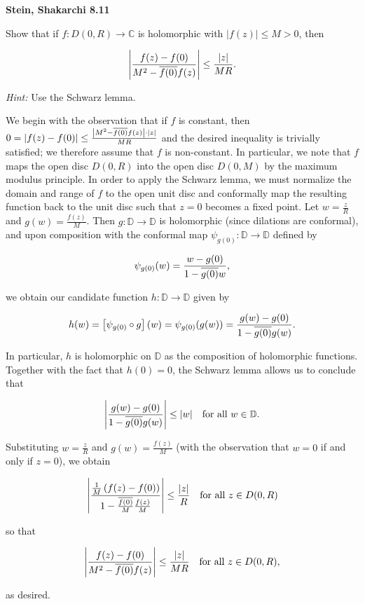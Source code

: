 \textbf{Stein, Shakarchi 8.11}

Show that if $f : D(0, R) \to \mathbb{C}$ is holomorphic with $|f(z)| \leq M > 0$, then

$$
\left| \frac{f(z) - f(0)}{M^2 - \overline{f(0)} f(z)} \right| \le \frac{|z|}{MR}.
$$

\textit{Hint: } Use the Schwarz lemma.

\begin{solution}
  We begin with the observation that if $f$ is constant, then
  $0 = |f(z) - f(0)| \le \frac{\left|M^2 - \overline{f(0)}f(z)\right| \cdot |z|}{MR}$ 
  and the desired inequality is trivially satisfied; we therefore assume that $f$ is non-constant. In particular, we note that $f$ maps the open disc $D(0, R)$ 
  into the open disc $D(0, M)$ by the maximum modulus principle. In order to apply the Schwarz lemma, we must normalize 
  the domain and range of $f$ to the open unit disc and conformally map the resulting function back to the unit disc 
  such that $z = 0$ becomes a fixed point. Let $w = \frac{z}{R}$ and $g(w) = \frac{f(z)}{M}$. Then $g : \mathbb{D} \to \mathbb{D}$ is holomorphic (since 
  dilations are conformal), and upon composition with the conformal map $\psi_{g(0)}: \mathbb{D} \to \mathbb{D}$ defined 
  by

  $$
  \psi_{g(0)}(w) = \frac{w - g(0)}{1 - \overline{g(0)}w},
  $$

  we obtain our candidate function $h: \mathbb{D} \to \mathbb{D}$ given by

  $$
  h(w) = \left[\psi_{g(0)} \circ g\right] (w) = \psi_{g(0)}(g(w)) = \frac{g(w) - g(0)}{1 - \overline{g(0)}g(w)}.
  $$

  In particular, $h$ is holomorphic on $\mathbb{D}$ as the composition of holomorphic functions. Together with the fact 
  that $h(0) = 0$, the Schwarz lemma allows us to conclude that 

  $$
  \left| \frac{g(w) - g(0)}{1 - \overline{g(0)}g(w)} \right| \le |w| \quad \text{for all } w \in \mathbb{D}.
  $$

  Substituting $w = \frac{z}{R}$ and $g(w) = \frac{f(z)}{M}$ (with the observation that $w = 0$ if and only if $z = 0$), 
  we obtain 

  $$
  \left| \frac{\frac{1}{M}\left(f(z) - f(0)\right)}{1 - \frac{\overline{f(0)}}{M} \frac{f(z)}{M}} \right| 
    \le \frac{|z|}{R} \quad \text{for all } z \in D(0, R)
  $$

  so that 

  $$
  \left| \frac{f(z) - f(0)}{M^2 - \overline{f(0)} f(z)} \right| \le \frac{|z|}{MR} \quad \text{for all } z \in D(0, R),
  $$

  as desired.
  \ \\
\end{solution}

